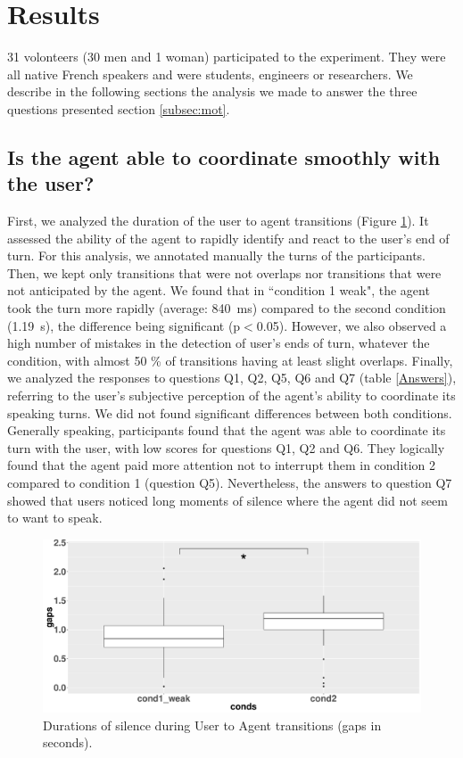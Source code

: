 \section{Results}

31 volonteers (30 men and 1 woman) participated to the experiment. They were all native French speakers and were students, engineers or researchers. We describe in the following sections the analysis we made to answer the three questions presented section \ref{subsec:mot}.

\subsection{Is the agent able to coordinate smoothly with the user?}

First, we analyzed the duration of the user to agent transitions (Figure \ref{box_ua}). It assessed the ability of the agent to rapidly identify and react to the user's end of turn. For this analysis, we annotated manually the turns of the participants. Then, we kept only transitions that were not overlaps nor transitions that were not anticipated by the agent. We found that in ``condition 1 weak", the agent took the turn more rapidly (average: 840~ms) compared to the second condition (1.19~s), the difference being significant (p$<$0.05). However, we also observed a high number of mistakes in the detection of user's ends of turn, whatever the condition, with almost 50 \% of transitions having at least slight overlaps.  
Finally, we analyzed the responses to questions Q1, Q2, Q5, Q6 and Q7 (table \ref{Answers}), referring to the user's subjective perception of the agent's ability to coordinate its speaking turns. We did not found significant differences between both conditions. Generally speaking, participants found that the agent was able to coordinate its turn with the user, with low scores for questions Q1, Q2 and Q6. They logically found that the agent paid more attention not to interrupt them in condition 2 compared to condition 1 (question Q5). Nevertheless, the answers to question Q7 showed that users noticed long moments of silence where the agent did not seem to want to speak. 
 
\begin{figure}
\centering
\includegraphics[width=\linewidth]{figure/boxTransitionsUA.pdf}
\caption{Durations of silence during User to Agent transitions (gaps in seconds).}
\label{box_ua}
\end{figure}
  
